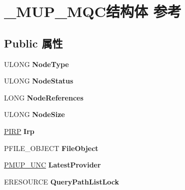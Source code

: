 \hypertarget{struct___m_u_p___m_q_c}{}\section{\+\_\+\+M\+U\+P\+\_\+\+M\+Q\+C结构体 参考}
\label{struct___m_u_p___m_q_c}
\subsection*{Public 属性}
\begin{DoxyCompactItemize}
\item 
\mbox{\label{struct___m_u_p___m_q_c_aa296983c339c77891e64a4a265c5785c}} 
U\+L\+O\+NG {\bfseries Node\+Type}
\item 
\mbox{\label{struct___m_u_p___m_q_c_ab609fb55db5b736e2fac22c558a70b47}} 
U\+L\+O\+NG {\bfseries Node\+Status}
\item 
\mbox{\label{struct___m_u_p___m_q_c_a192a0297a6d39f4b5ed84f7874863f83}} 
L\+O\+NG {\bfseries Node\+References}
\item 
\mbox{\label{struct___m_u_p___m_q_c_a4efbfdd4c52ff79886c723ad2f8a6dd8}} 
U\+L\+O\+NG {\bfseries Node\+Size}
\item 
\mbox{\label{struct___m_u_p___m_q_c_a6ffc54e48a3c59e942217e2a78d3b6fd}} 
\hyperlink{interfacevoid}{P\+I\+RP} {\bfseries Irp}
\item 
\mbox{\label{struct___m_u_p___m_q_c_a470d27cd61a33963b3c81e29f19086d1}} 
P\+F\+I\+L\+E\+\_\+\+O\+B\+J\+E\+CT {\bfseries File\+Object}
\item 
\mbox{\label{struct___m_u_p___m_q_c_a48773dac6eb6a3ee6a4ec0d95d48dd08}} 
\hyperlink{struct___m_u_p___u_n_c}{P\+M\+U\+P\+\_\+\+U\+NC} {\bfseries Latest\+Provider}
\item 
\mbox{\label{struct___m_u_p___m_q_c_aab1b7b19265dd4fd6c61cd9ed366b339}} 
E\+R\+E\+S\+O\+U\+R\+CE {\bfseries Query\+Path\+List\+Lock}
\item 
\mbox{\label{struct___m_u_p___m_q_c_a680b916ce95d596bbdef2b33678a7260}} 

\end{DoxyCompactItemize}
